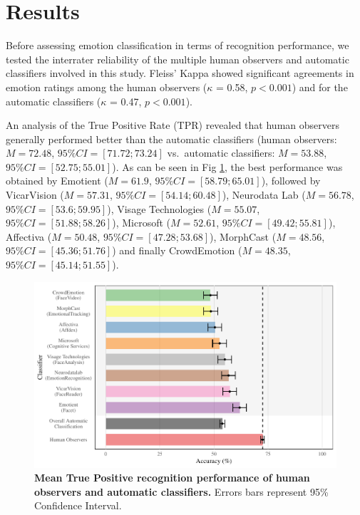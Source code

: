 \documentclass[10pt,letterpaper]{article}
\begin{document}
\hypertarget{results}{%
\section*{Results}\label{results}}

Before assessing emotion classification in terms of recognition performance, we tested the interrater reliability of the multiple human observers and automatic classifiers involved in this study. Fleiss' Kappa showed significant agreements in emotion ratings among the human observers (\(\kappa\) = 0.58, \(p < 0.001\)) and for the automatic classifiers (\(\kappa\) = 0.47, \(p < 0.001\)).

An analysis of the True Positive Rate (TPR) revealed that human observers generally performed better than the automatic classifiers (human observers: \(M = 72.48\), \(95\% CI = [71.72;73.24]\) vs.~automatic classifiers: \(M = 53.88\), \(95\% CI = [52.75;55.01]\)). As can be seen in Fig \ref{fig:plot-classifier}, the best performance was obtained by Emotient (\(M = 61.9\), \(95\% CI = [58.79;65.01]\)), followed by VicarVision (\(M = 57.31\), \(95\% CI = [54.14;60.48]\)), Neurodata Lab (\(M = 56.78\), \(95\% CI = [53.6;59.95]\)), Visage Technologies (\(M = 55.07\), \(95\% CI = [51.88;58.26]\)), Microsoft (\(M = 52.61\), \(95\% CI = [49.42;55.81]\)), Affectiva (\(M = 50.48\), \(95\% CI = [47.28;53.68]\)), MorphCast (\(M = 48.56\), \(95\% CI = [45.36;51.76]\)) and finally CrowdEmotion (\(M = 48.35\), \(95\% CI = [45.14;51.55]\)).

\begin{figure}[!h]
\includegraphics[width=\textwidth]{manuscript_plos_au_latex_files/figure-latex/plot-classifier-1} \caption{\textbf{Mean True Positive recognition performance of human observers and automatic classifiers.} Errors bars represent 95\% Confidence Interval.}\label{fig:plot-classifier}
\end{figure}
\end{document}
